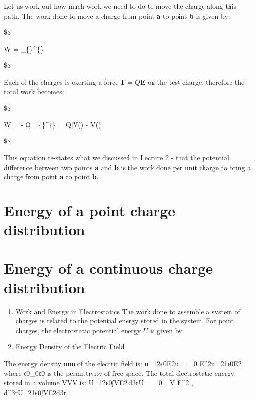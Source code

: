 \documentclass[
  letterpaper,
  DIV=11,
  numbers=noendperiod]{scrreprt}
\begin{document}
Let us work out how much work we need to do to move the charge along
this path. The work done to move a charge from point \textbf{a} to point
\textbf{b} is given by:

\$\$

W = \int\_\{\}\^{}\{\}
 \cdot {}  

\$\$

Each of the charges is exerting a force
\(\mathrm{\mathbf{F}}= Q \mathrm{\mathbf{E}}\) on the test charge,
therefore the total work becomes:

\$\$

W = - Q \int\_\{\}\^{}\{\}
 \cdot {}  =
Q{[}V() - V(){]}

\$\$

This equation re-states what we discussed in Lecture 2 - that the
potential difference between two points \(\mathrm{\mathbf{a}}\) and
\(\mathrm{\mathbf{b}}\) is the work done per unit charge to bring a
charge from point \(\mathrm{\mathbf{a}}\) to point
\(\mathrm{\mathbf{b}}\).

\section{Energy of a point charge
distribution}\label{energy-of-a-point-charge-distribution}

\section{Energy of a continuous charge
distribution}\label{energy-of-a-continuous-charge-distribution}

\begin{enumerate}
\def\labelenumi{\arabic{enumi}.}
\setcounter{enumi}{9}
\item
  Work and Energy in Electrostatics The work done to assemble a system
  of charges is related to the potential energy stored in the system.
  For point charges, the electrostatic potential energy \(U\) is given
  by:
\item
  Energy Density of the Electric Field
\end{enumerate}

The energy density uuu of the electric field is: u=12ϵ0E2u = 
\epsilon\_0 E\^{}2u=21ϵ0E2 where ϵ0\epsilon\_0ϵ0 is the permittivity of
free space. The total electrostatic energy stored in a volume VVV is:
U=12ϵ0∫VE2 d3rU =  \epsilon\_0 \int\_V E\^{}2 ,
d\^{}3rU=21ϵ0∫VE2d3r
\end{document}
